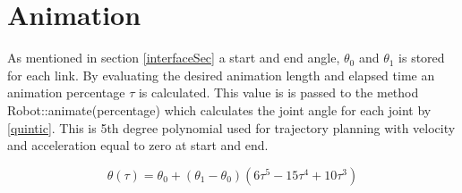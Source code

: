 
\section{Animation}

As mentioned in section \ref{interfaceSec} a start and end angle, $\theta_0$ and $\theta_1$ is stored for each link. By evaluating the desired animation length and elapsed time an animation percentage $\tau$ is calculated. This value is is passed to the method \textsf{Robot::animate(percentage)} which calculates the joint angle for each joint by \eqref{quintic}. This is 5th degree polynomial used for trajectory planning with velocity and acceleration equal to zero at start and end.

\begin{equation}\label{quintic}
\theta\left ( \tau \right ) = \theta_0 + \left ( \theta_1 - \theta_0\right )\left ( 6 \tau^5-15\tau^4 + 10\tau^3\right )
\end{equation}